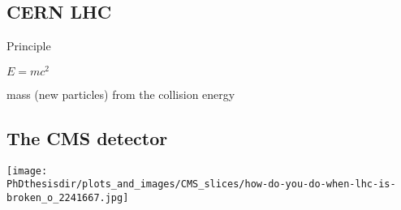 \subsection*{CERN LHC}
\begin{frame}{Principle}

\begin{center}
{\LARGE $E = mc^2$}

\vfill

mass (new particles) from the collision energy
\end{center}

\end{frame}

%


\subsection*{The CMS detector}

\begin{frame}
\begin{center}
\texttt{[image: \\PhDthesisdir/plots\_and\_images/CMS\_slices/how-do-you-do-when-lhc-is-broken\_o\_2241667.jpg]}
\end{center}
\end{frame}


%
%


%
